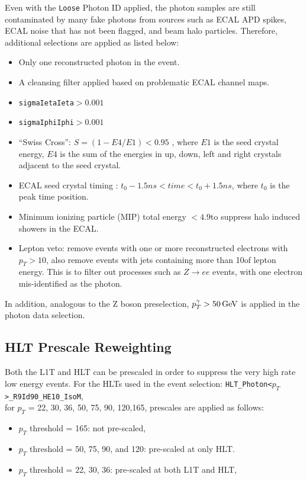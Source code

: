 \vspace{0.3cm}
Even with the \texttt{Loose} Photon ID applied, the photon samples are still contaminated by many fake photons from sources such as ECAL APD spikes, ECAL noise that has not been flagged, and beam halo particles. Therefore, additional selections are applied as listed below:
\begin{itemize}
\item Only one reconstructed photon in the event. 
\item A cleansing filter applied based on problematic ECAL channel maps.
\item \texttt{sigmaIetaIeta}$>0.001$
\item \texttt{sigmaIphiIphi}$>0.001$  
\item ``Swiss Cross'':  $S = (1-E4/E1)<0.95$ , where $E1$ is the seed crystal energy, $E4$ is the sum of the energies in up, down, left and right crystals adjacent to the seed crystal.
\item ECAL seed crystal timing :   $t_0-1.5 ns < time < t_0+1.5 ns$, where $t_0$ is the peak time position. 
\item Minimum ionizing particle (MIP) total energy $< 4.9$\GeV to suppress halo induced showers in the ECAL.
\item Lepton veto: remove events with one or more reconstructed electrons with $ p_T > 10$\GeV, 
also remove events with jets containing more than 10\GeV of lepton energy.
This is to filter out processes such as $Z\to ee$ events, with one electron mis-identified as the photon. 
\end{itemize}

In addition, analogous to the Z boson preselection, $p_T ^{\gamma} > 50\,\text{Ge\hspace{-.08em}V}$ is applied in the photon data selection.

\subsection{\boldmath{\gjets} HLT Prescale Reweighting}\label{sec:bg_gjetHLT}
Both the L1T and HLT can be prescaled in order to suppress the very high rate low energy events. For the HLTs used in the \gjets event selection:
\texttt{HLT\_Photon<$p_T$>\_R9Id90\_HE10\_IsoM}, \\
 for $p_T$ = 22, 30, 36, 50, 75, 90, 120,165\GeV, prescales are applied as follows:
\begin{itemize}
\item $p_T$ threshold = 165\GeV: not pre-scaled, 
\item $p_T$ threshold = 50, 75, 90, and 120\GeV:  pre-scaled at only HLT.  
\item $p_T$ threshold = 22, 30, 36\GeV: pre-scaled at both L1T and HLT, 
\end{itemize}

